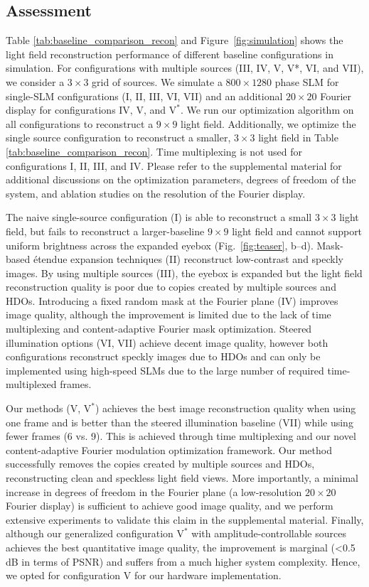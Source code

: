 \subsection{Assessment}


Table \ref{tab:baseline_comparison_recon} and Figure~\ref{fig:simulation} shows the light field reconstruction performance of different baseline configurations in simulation. For configurations with multiple sources (III, IV, V, V*, VI, and VII), we consider a $3\times3$ grid of sources. We simulate a $800 \times 1280$ phase SLM for single-SLM configurations (I, II, III, VI, VII) and an additional $20 \times 20$ Fourier display for configurations IV, V, and $\text{V}^*$. We run our optimization algorithm on all configurations to reconstruct a $9 \times 9$ light field. Additionally, we optimize the single source configuration to reconstruct a smaller, $3 \times 3$ light field in Table \ref{tab:baseline_comparison_recon}. Time multiplexing is not used for configurations I, II, III, and IV. Please refer to the supplemental material for additional discussions on the optimization parameters, degrees of freedom of the system, and ablation studies on the resolution of the Fourier display.

The naive single-source configuration (I) is able to reconstruct a small $3 \times 3$ light field, but fails to reconstruct a larger-baseline $9 \times 9$ light field and cannot support uniform brightness across the expanded eyebox (Fig.~\ref{fig:teaser}, b--d). Mask-based \'etendue expansion techniques (II) reconstruct low-contrast and speckly images. By using multiple sources (III), the eyebox is expanded but the light field reconstruction quality is poor due to copies created by multiple sources and HDOs. Introducing a fixed random mask at the Fourier plane (IV) improves image quality, although the improvement is limited due to the lack of time multiplexing and content-adaptive Fourier mask optimization. Steered illumination options (VI, VII) achieve decent image quality, however both configurations reconstruct speckly images due to HDOs and can only be implemented using high-speed SLMs due to the large number of required time-multiplexed frames.

Our methods (V, $\text{V}^*$) achieves the best image reconstruction quality when using one frame and is better than the steered illumination baseline (VII) while using fewer frames (6 vs. 9). This is achieved through time multiplexing and our novel content-adaptive Fourier modulation optimization framework. Our method successfully removes the copies created by multiple sources and HDOs, reconstructing clean and speckless light field views. More importantly, a minimal increase in degrees of freedom in the Fourier plane (a low-resolution $20 \times 20$ Fourier display) is sufficient to achieve good image quality, and we perform extensive experiments to validate this claim in the supplemental material. Finally, although our generalized configuration $\text{V}^*$ with amplitude-controllable sources achieves the best quantitative image quality, the improvement is marginal (<0.5 dB in terms of PSNR) and suffers from a much higher system complexity. Hence, we opted for configuration V for our hardware implementation.


